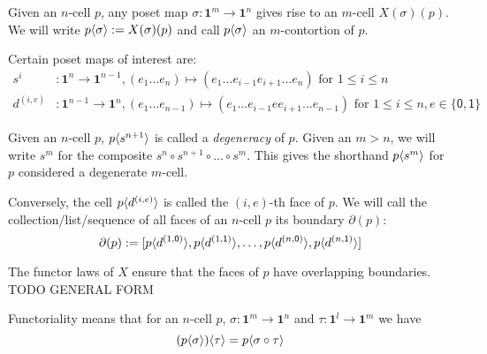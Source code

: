 \documentclass[11pt]{article}
\theoremstyle{definition}
\newcommand{\mdef}{:=}
\newcommand{\mname}[1]{\textit{{#1}}}
\newcommand{\mlist}[1]{[ {#1} ]}
\newcommand{\pint}[1]{\mathbf{1}^{#1}}
\newcommand{\izero}{\mathsf{0}}
\newcommand{\ione}{\mathsf{1}}
\newcommand{\smap}[1]{s^{{#1}}}
\newcommand{\dmap}[2]{d^{({#1} , {#2})}}
\newcommand{\cont}[2]{ \ifthenelse{\equal{#2}{}}{#1}{{#1}\langle{#2}\rangle} }
\newcommand{\boundary}[1]{\partial({#1})}
\begin{document}

Given an $n$-cell $p$, any poset map $\sigma : \pint{m} \to \pint{n}$ gives rise to an $m$-cell
$X(\sigma)(p)$. We will write $\cont{p}{\sigma} \mdef X(\sigma)(p)$ and call
$\cont{p}{\sigma}$ an $m$-contortion of $p$.

Certain poset maps of interest are:
\begin{align*}
  \smap{i} &: \pint{n} \to \pint{n-1}, (e_1 \ldots e_n) \mapsto (e_1 \ldots e_{i-1} e_{i+1} \ldots e_n) \text{ for } 1 \leq i \leq n\\
  \dmap{i}{e} &: \pint{n-1} \to \pint{n}, 
                (e_1 \ldots e_{n-1}) \mapsto (e_1 \ldots e_{i-1} e e_{i+1} \ldots e_{n-1}) \text{ for } 1 \leq i \leq n, e \in \{\izero,\ione\}
\end{align*}

Given an $n$-cell $p$, $\cont{p}{\smap{n+1}}$ is called a \mname{degeneracy} of
$p$. Given an $m > n$, we will write $\smap{m}$ for the composite
$\smap{n} \circ \smap{n+1} \circ \ldots \circ \smap{m}$. This gives the shorthand
$\cont{p}{\smap{m}}$ for $p$ considered a degenerate $m$-cell.

Conversely, the cell $\cont{p}{\dmap{i}{e}}$ is called the $(i,e)$-th face of $p$. We
will call the collection/list/sequence of all faces of an $n$-cell $p$ its boundary $\boundary{p}$:
$$\boundary{p} \mdef \mlist{ \cont{p}{\dmap{1}{\izero}},
  \cont{p}{\dmap{1}{\ione}} , \ldots , \cont{p}{\dmap{n}{\izero}}, \cont{p}{\dmap{n}{\ione}} }$$

The functor laws of $X$ ensure that the faces of $p$ have overlapping
boundaries. TODO GENERAL FORM



Functoriality means that for an $n$-cell $p$, $\sigma : \pint{m} \to \pint{n}$ and $\tau : \pint{l} \to \pint{m}$ we have
$$\cont{(\cont{p}{\sigma})}{\tau} = \cont{p}{\sigma \circ \tau}$$
\end{document}
